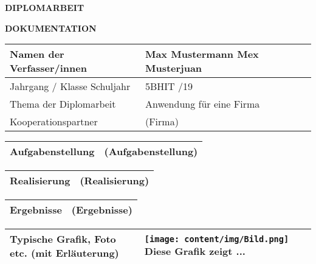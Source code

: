 \begin{center}
\textbf{\LARGE DIPLOMARBEIT}

\textbf{DOKUMENTATION}
\end{center}

\begin{tabular}{|p{53mm}|p{110mm}|@{}m{0cm}@{}}
\hline
Namen der \newline Verfasser/innen & Max Mustermann \newline Mex Musterjuan & \\ [0.5cm]
\hline
Jahrgang / Klasse \newline Schuljahr & 5BHIT \newline 2018/19 & \\
\hline
Thema der Diplomarbeit & Anwendung f\"ur eine Firma & \\ [1cm]
\hline
Kooperationspartner & (Firma) & \\ [0.5cm]
\hline
\end{tabular}

\vspace{0.5cm}

\begin{tabular}{|p{53mm}|p{110mm}|}
\hline
\vspace{2cm} Aufgabenstellung & \vspace{2cm} (Aufgabenstellung) \\ [2cm]
\hline
\end{tabular}

\vspace{0.5cm}

\begin{tabular}{|p{53mm}|p{110mm}|}
\hline
\vspace{1.5cm} Realisierung & \vspace{1.5cm} (Realisierung) \\ [1.5cm]
\hline
\end{tabular}

\vspace{0.5cm}

\begin{tabular}{|p{53mm}|p{110mm}|}
\hline
\vspace{2cm} Ergebnisse & \vspace{2cm} (Ergebnisse) \\ [2cm]
\hline
\end{tabular}
\newpage

\begin{tabular}{|p{53mm}|p{110mm}|}
\hline
\vspace{5.5cm}
Typische Grafik, Foto etc. (mit Erl\"auterung) & \vspace{0.1cm}
\texttt{[image: content/img/Bild.png]}
Diese Grafik zeigt ...
\\ [2.5cm]
\hline
\end{tabular}

